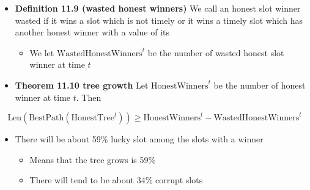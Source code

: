 \documentclass[11pt]{article}
\begin{document}
\begin{itemize}
\item \textbf{Definition 11.9 (wasted honest winners)} We call an honest slot winner wasted if it wins a slot which is not timely or it wins a timely slot which has another honest winner with a value of its
\begin{itemize}
\item We let \(\text{WastedHonestWinners}^t\) be the number of wasted honest slot winner at time \(t\)
\end{itemize}

\item \textbf{Theorem 11.10 tree growth} Let \(\text{HonestWinners}^t\) be the number of honest winner at time \(t\). Then
\end{itemize}
\begin{equation}
  \text{Len}(\text{BestPath}(\text{HonestTree}^t)) \geq \text{HonestWinners} ^t -\text{WastedHonestWinners}^t
\end{equation}

\begin{itemize}
\item There will be about 59\% lucky slot among the slots with a winner
\begin{itemize}
\item Means that the tree grows is 59\%
\item There will tend to be about 34\% corrupt slots
\end{itemize}
\end{itemize}
\end{document}
